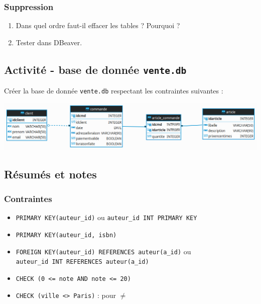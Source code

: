 \documentclass[a4paper,17pt]{extarticle}
\providecommand{\tightlist}{%
      \setlength{\itemsep}{0pt}\setlength{\parskip}{0pt}}
\begin{document}
    \hypertarget{suppression}{%
\subsubsection{Suppression}\label{suppression}}

    \begin{enumerate}
\def\labelenumi{\arabic{enumi}.}
\tightlist
\item
  Dans quel ordre faut-il effacer les tables ? Pourquoi ?
\item
  Tester dans DBeaver.
\end{enumerate}

    \hypertarget{activituxe9---base-de-donnuxe9e-vente.db}{%
\subsection{\texorpdfstring{Activité - base de donnée
\texttt{vente.db}}{Activité - base de donnée vente.db}}\label{activituxe9---base-de-donnuxe9e-vente.db}}

    Créer la base de donnée \texttt{vente.db} respectant les contraintes
suivantes :

    \includegraphics{./img-ex_vente.png}

    \hypertarget{ruxe9sumuxe9s-et-notes}{%
\subsection{Résumés et notes}\label{ruxe9sumuxe9s-et-notes}}

    \hypertarget{contraintes}{%
\subsubsection{Contraintes}\label{contraintes}}

\begin{itemize}
\tightlist
\item
  \texttt{PRIMARY\ KEY(auteur\_id)} ou
  \texttt{auteur\_id\ INT\ PRIMARY\ KEY}
\item
  \texttt{PRIMARY\ KEY(auteur\_id,\ isbn)}
\item
  \texttt{FOREIGN\ KEY(auteur\_id)\ REFERENCES\ auteur(a\_id)} ou
  \texttt{auteur\_id\ INT\ REFERENCES\ auteur(a\_id)}
\item
  \texttt{CHECK\ (0\ \textless{}=\ note\ AND\ note\ \textless{}=\ 20)}
\item
  \texttt{CHECK\ (ville\ \textless{}\textgreater{}\ \textquotesingle{}Paris\textquotesingle{})}
  : pour \(\neq\)
\end{itemize}
\end{document}

